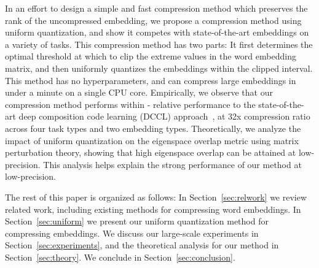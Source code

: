In an effort to design a simple and fast compression method which preserves the rank of the uncompressed embedding, we propose a compression method using uniform quantization, and show it competes with state-of-the-art embeddings on a variety of tasks.
This compression method has two parts: It first determines the optimal threshold at which to clip the extreme values in the word embedding matrix, and then uniformly quantizes the embeddings within the clipped interval.
This method has no hyperparameters, and can compress large embeddings in under a minute on a single CPU core.
Empirically, we observe that our compression method performs within - relative performance to the state-of-the-art deep composition code learning (DCCL) approach~\citep{dccl17}, at 32x compression ratio across four task types and two embedding types.
Theoretically, we analyze the impact of uniform quantization on the eigenspace overlap metric using matrix perturbation theory, showing that high eigenspace overlap can be attained at low-precision.
This analysis helps explain the strong performance of our method at low-precision.

The rest of this paper is organized as follows:
In Section~\ref{sec:relwork} we review related work, including existing methods for compressing word embeddings.
In Section~\ref{sec:uniform} we present our uniform quantization method for compressing embeddings.
We discuss our large-scale experiments in Section~\ref{sec:experiments}, and the theoretical analysis for our method in Section~\ref{sec:theory}.
We conclude in Section~\ref{sec:conclusion}.





